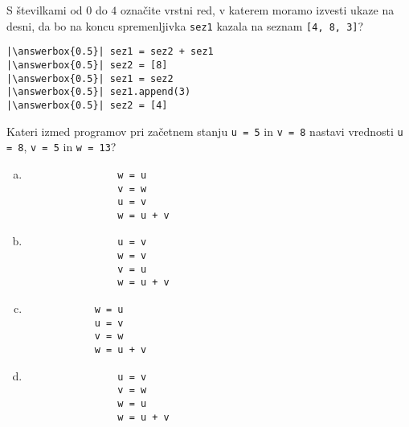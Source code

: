 \documentclass[arhiv, 10pt]{../izpit}
\newcommand{\inlinepy}[1]{\texttt{#1}}
\newcommand{\answerbox}[1]{\framebox{\vphantom{\large M}\hspace{#1cm}}}
\begin{document}
        \naloga*
        \begin{multicols}{2}
        \noindent 
        S številkami od $0$ do $4$ označite vrstni red, v katerem moramo izvesti ukaze na desni, da bo na koncu spremenljivka \inlinepy{sez1} kazala na seznam \inlinepy{[4, 8, 3]}?
    
        \columnbreak
        \noindent
        \begin{verbatim}
|\answerbox{0.5}| sez1 = sez2 + sez1
|\answerbox{0.5}| sez2 = [8]
|\answerbox{0.5}| sez1 = sez2
|\answerbox{0.5}| sez1.append(3)
|\answerbox{0.5}| sez2 = [4]

        \end{verbatim}
        \end{multicols}
    
            
        \naloga*
        
        Kateri izmed programov pri začetnem stanju
            \inlinepy{u = 5} in
            \inlinepy{v = 8}
        nastavi vrednosti
            \inlinepy{u = 8},
            \inlinepy{v = 5} in
            \inlinepy{w = 13}?
    
        \begin{multicols}{4}
        \begin{enumerate}[(a)]
\item 
                \begin{verbatim}
                w = u
                v = w
                u = v
                w = u + v
                \end{verbatim}
            
\item 
                \begin{verbatim}
                u = v
                w = v
                v = u
                w = u + v
                \end{verbatim}
            
\item 
            \begin{verbatim}
            w = u
            u = v
            v = w
            w = u + v
            \end{verbatim}
        
\item 
                \begin{verbatim}
                u = v
                v = w
                w = u
                w = u + v
                \end{verbatim}
            
\end{enumerate}

        \end{multicols}
    
\end{document}
